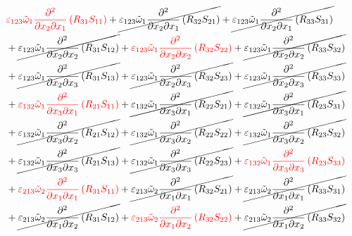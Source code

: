 \begin{equation}
	\begin{split}
&{\color{red}\varepsilon_{123}\tilde{\omega}_{1}\pdv{}{x_{2}}{x_{1}}\left(R_{31}S_{11}\right)}
		+\cancel{\varepsilon_{123}\tilde{\omega}_{1}\pdv{}{x_{2}}{x_{1}}\left(R_{32}S_{21}\right)}
		+\cancel{\varepsilon_{123}\tilde{\omega}_{1}\pdv{}{x_{2}}{x_{1}}\left(R_{33}S_{31}\right)}\\
&		+\cancel{\varepsilon_{123}\tilde{\omega}_{1}\pdv{}{x_{2}}{x_{2}}\left(R_{31}S_{12}\right)}
		+{\color{red}\varepsilon_{123}\tilde{\omega}_{1}\pdv{}{x_{2}}{x_{2}}\left(R_{32}S_{22}\right)}
		+\cancel{\varepsilon_{123}\tilde{\omega}_{1}\pdv{}{x_{2}}{x_{2}}\left(R_{33}S_{32}\right)}\\
&		+\cancel{\varepsilon_{123}\tilde{\omega}_{1}\pdv{}{x_{2}}{x_{3}}\left(R_{31}S_{13}\right)}
		+\cancel{\varepsilon_{123}\tilde{\omega}_{1}\pdv{}{x_{2}}{x_{3}}\left(R_{32}S_{23}\right)}
		+\cancel{\varepsilon_{123}\tilde{\omega}_{1}\pdv{}{x_{2}}{x_{3}}\left(R_{33}S_{33}\right)}\\
&		+{\color{red}\varepsilon_{132}\tilde{\omega}_{1}\pdv{}{x_{3}}{x_{1}}\left(R_{21}S_{11}\right)}
		+\cancel{\varepsilon_{132}\tilde{\omega}_{1}\pdv{}{x_{3}}{x_{1}}\left(R_{22}S_{21}\right)}
		+\cancel{\varepsilon_{132}\tilde{\omega}_{1}\pdv{}{x_{3}}{x_{1}}\left(R_{23}S_{31}\right)}\\
&		+\cancel{\varepsilon_{132}\tilde{\omega}_{1}\pdv{}{x_{3}}{x_{2}}\left(R_{21}S_{12}\right)}
		+\cancel{\varepsilon_{132}\tilde{\omega}_{1}\pdv{}{x_{3}}{x_{2}}\left(R_{22}S_{22}\right)}
		+\cancel{\varepsilon_{132}\tilde{\omega}_{1}\pdv{}{x_{3}}{x_{2}}\left(R_{23}S_{32}\right)}\\
&		+\cancel{\varepsilon_{132}\tilde{\omega}_{1}\pdv{}{x_{3}}{x_{3}}\left(R_{21}S_{13}\right)}
		+\cancel{\varepsilon_{132}\tilde{\omega}_{1}\pdv{}{x_{3}}{x_{3}}\left(R_{22}S_{23}\right)}
		+{\color{red}\varepsilon_{132}\tilde{\omega}_{1}\pdv{}{x_{3}}{x_{3}}\left(R_{23}S_{33}\right)}\\
&		+{\color{red}\varepsilon_{213}\tilde{\omega}_{2}\pdv{}{x_{1}}{x_{1}}\left(R_{31}S_{11}\right)}
		+\cancel{\varepsilon_{213}\tilde{\omega}_{2}\pdv{}{x_{1}}{x_{1}}\left(R_{32}S_{21}\right)}
		+\cancel{\varepsilon_{213}\tilde{\omega}_{2}\pdv{}{x_{1}}{x_{1}}\left(R_{33}S_{31}\right)}\\
&		+\cancel{\varepsilon_{213}\tilde{\omega}_{2}\pdv{}{x_{1}}{x_{2}}\left(R_{31}S_{12}\right)}
		+{\color{red}\varepsilon_{213}\tilde{\omega}_{2}\pdv{}{x_{1}}{x_{2}}\left(R_{32}S_{22}\right)}
		+\cancel{\varepsilon_{213}\tilde{\omega}_{2}\pdv{}{x_{1}}{x_{2}}\left(R_{33}S_{32}\right)}\\

\end{split}
\end{equation}
